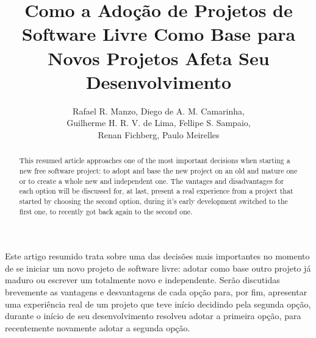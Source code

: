 \documentclass[12pt]{article}
\title{Como a Adoção de Projetos de Software Livre Como Base para Novos Projetos Afeta Seu Desenvolvimento}
\author{Rafael R. Manzo\inst{1}, Diego de A. M. Camarinha\inst{1},\\
        Guilherme H. R. V. de Lima\inst{1}, Fellipe S. Sampaio\inst{1},\\
        Renan Fichberg\inst{1}, Paulo Meirelles\inst{2}}
\begin{document}
\maketitle

\begin{abstract}
  This resumed article approaches one of the most important decisions when starting a new free software project: to adopt and base the new project on an old and mature one or to create a whole new and independent one. The vantages and disadvantages for each option will be discussed for, at last, present a real experience from a project that started by choosing the second option, during it's early development switched to the first one, to recently got back again to the second one.
\end{abstract}

\begin{resumo}
  Este artigo resumido trata sobre uma das decisões mais importantes no momento de se iniciar um novo projeto de software livre: adotar como base outro projeto já maduro ou escrever um totalmente novo e independente. Serão discutidas brevemente as vantagens e desvantagens de cada opção para, por fim, apresentar uma experiência real de um projeto que teve início decidindo pela segunda opção, durante o início de seu desenvolvimento resolveu adotar a primeira opção, para recentemente novamente adotar a segunda opção.
\end{resumo}


\newpage


\end{document}
